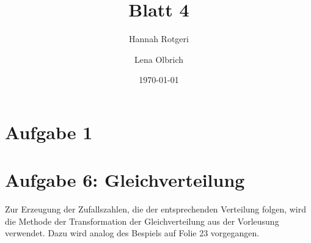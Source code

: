 \documentclass[11pt,a4paper]{article}
\title{Blatt 4}
\date{\today}
\author{Hannah Rotgeri \and Lena Olbrich}
\begin{document}
    \maketitle

    \section*{Aufgabe 1}



	
	\section*{Aufgabe 6: Gleichverteilung}
	
	Zur Erzeugung der Zufallszahlen, die der entsprechenden Verteilung folgen,
	wird die Methode der Transformation der Gleichverteilung aus der Vorleusung verwendet.
	Dazu wird analog des Bespiels auf Folie 23 vorgegangen.
\end{document}

